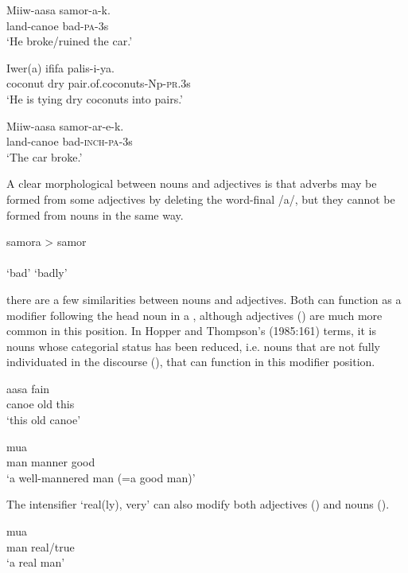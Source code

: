 \ea%
\label{ex:x482}
\gll Miiw-aasa samor-a-k. \\
land-canoe bad-\textsc{pa}-3s\\
\glt`He broke/ruined the car.'
\z

\ea%
\label{ex:x484}
\gll Iwer(a) ififa palis-i-ya. \\
coconut dry pair.of.coconuts-Np-\textsc{pr}.3s\\
\glt`He is tying dry coconuts into pairs.'
\z

\ea%
\label{ex:x483}
\gll Miiw-aasa samor-ar-e-k. \\
land-canoe bad-\textsc{inch}-\textsc{pa}-3s\\
\glt`The car broke.'
\z

A clear morphological  between nouns and adjectives is that adverbs may be formed from some adjectives by deleting the word-final /a/, but they cannot be formed from nouns in the same way.

\ea%
\label{ex:x19}
\gll samora {{\textgreater} samor} \\
 \\
\glt`bad' `badly'
\z

 there are a few similarities between nouns and adjectives. Both can function as a modifier following the head noun in a , although adjectives () are much more common in this position. In {Hopper and Thompson's (1985:161)} terms, it is nouns whose categorial status has been reduced, i.e. nouns that are not fully individuated in the discourse (), that can function in this modifier position.

\ea%
\label{ex:x9}
\gll aasa  fain \\
canoe old this\\
\glt`this old canoe'
\z

\ea%
\label{ex:x10}
\gll mua   \\
man manner good\\
\glt`a well-mannered man (=a good man)'
\z

The intensifier  `real(ly), very' can also modify both adjectives () and nouns ().

\ea%
\label{ex:x11}
\gll mua  \\
man real/true\\
\glt`a real man'
\z

